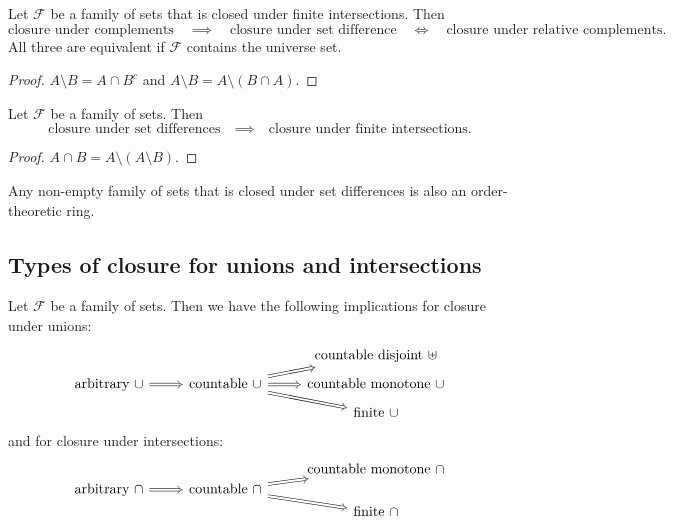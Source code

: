 \begin{lemma}
Let $\mathcal{F}$ be a family of sets that is closed under finite intersections. Then
\[ \text{closure under complements} \quad\implies\quad \text{closure under set difference} \quad\iff\quad \text{closure under relative complements.} \]
All three are equivalent if $\mathcal{F}$ contains the universe set.
\end{lemma}
\begin{proof}
$A\setminus B = A\cap B^c$ and $A\setminus B = A\setminus (B\cap A)$.
\end{proof}

\begin{lemma} \label{closureSetDifference}
Let $\mathcal{F}$ be a family of sets. Then
\[ \text{closure under set differences} \quad\implies\quad \text{closure under finite intersections.} \]
\end{lemma}
\begin{proof}
$A\cap B = A\setminus (A\setminus B)$.
\end{proof}

Any non-empty family of sets that is closed under set differences is also an order-theoretic ring.

\subsection{Types of closure for unions and intersections}
\begin{lemma} \label{unionsIntersectionClosureImplications}
Let $\mathcal{F}$ be a family of sets. Then we have the following implications for closure under unions:
\[ \begin{tikzcd}[row sep=tiny]
&& \text{countable disjoint $\uplus$} \\
\text{arbitrary $\cup$} \arrow[r, Rightarrow] & \text{countable $\cup$} \arrow[ur, Rightarrow] \arrow[r, Rightarrow] \arrow[dr, Rightarrow] & \text{countable monotone $\cup$} \\
&& \text{finite $\cup$}
\end{tikzcd} \]
and for closure under intersections:
\[ \begin{tikzcd}[row sep=0em]
&& \text{countable monotone $\cap$} \\
\text{arbitrary $\cap$} \arrow[r, Rightarrow] & \text{countable $\cap$} \arrow[ur, Rightarrow] \arrow[dr, Rightarrow] &  \\
&& \text{finite $\cap$}
\end{tikzcd} \]
\end{lemma}


